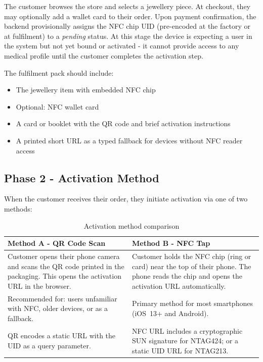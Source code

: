 \documentclass[
	a4paper, %
]{ChaosEngineReport}
\begin{document}
The customer browses the store and selects a jewellery piece. At checkout, they may optionally add a wallet card to their order. Upon payment confirmation, the backend provisionally assigns the NFC chip UID (pre-encoded at the factory or at fulfilment) to a \textit{pending} status. At this stage the device is expecting a user in the system but not yet bound or activated - it cannot provide access to any medical profile until the customer completes the activation step.

The fulfilment pack should include:
\begin{itemize}
  \item The jewellery item with embedded NFC chip
  \item Optional: NFC wallet card
  \item A card or booklet with the QR code and brief activation instructions
  \item A printed short URL as a typed fallback for devices without NFC reader access
\end{itemize}

\subsection{Phase 2 - Activation Method}

When the customer receives their order, they initiate activation via one of two methods:

\begin{table}[h!]
\centering
\small
{}
\begin{tabularx}{\linewidth}{@{} X X @{}}
  \toprule
  \textbf{Method A - QR Code Scan} &
  \textbf{Method B - NFC Tap} \\
  \midrule
  Customer opens their phone camera and scans the QR code printed in the packaging. This opens the activation URL in the browser. &
  Customer holds the NFC chip (ring or card) near the top of their phone. The phone reads the chip and opens the activation URL automatically. \\

  Recommended for: users unfamiliar with NFC, older devices, or as a fallback. &
  Primary method for most smartphones (iOS~13+ and Android). \\

  QR encodes a static URL with the UID as a query parameter. &
  NFC URL includes a cryptographic SUN signature for NTAG424; or a static UID URL for NTAG213. \\
\end{tabularx}
\caption{Activation method comparison}
\end{table}
\end{document}
